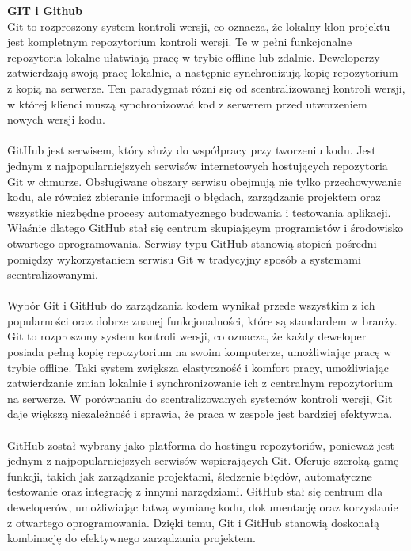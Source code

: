 \documentclass[12pt,a4paper]{article}
\begin{document}
\noindent \textbf{GIT i Github}\\
Git to rozproszony system kontroli wersji, co oznacza, że lokalny klon projektu jest kompletnym repozytorium kontroli wersji. Te w pełni funkcjonalne repozytoria lokalne ułatwiają pracę w trybie offline lub zdalnie. Deweloperzy zatwierdzają swoją pracę lokalnie, a następnie synchronizują kopię repozytorium z kopią na serwerze. Ten paradygmat różni się od scentralizowanej kontroli wersji, w której klienci muszą synchronizować kod z serwerem przed utworzeniem nowych wersji kodu.
\\\\
GitHub jest serwisem, który służy do współpracy przy tworzeniu kodu. Jest jednym z najpopularniejszych serwisów internetowych hostujących repozytoria Git w chmurze. Obsługiwane obszary serwisu obejmują nie tylko przechowywanie kodu, ale również zbieranie informacji o błędach, zarządzanie projektem oraz wszystkie niezbędne procesy automatycznego budowania i testowania aplikacji. Właśnie dlatego GitHub stał się centrum skupiającym programistów i środowisko otwartego oprogramowania. Serwisy typu GitHub stanowią stopień pośredni pomiędzy wykorzystaniem serwisu Git w tradycyjny sposób a systemami scentralizowanymi.
\\\\
Wybór Git i GitHub do zarządzania kodem wynikał przede wszystkim z ich popularności oraz dobrze znanej funkcjonalności, które są standardem w branży. Git to rozproszony system kontroli wersji, co oznacza, że każdy deweloper posiada pełną kopię repozytorium na swoim komputerze, umożliwiając pracę w trybie offline. Taki system zwiększa elastyczność i komfort pracy, umożliwiając zatwierdzanie zmian lokalnie i synchronizowanie ich z centralnym repozytorium na serwerze. W porównaniu do scentralizowanych systemów kontroli wersji, Git daje większą niezależność i sprawia, że praca w zespole jest bardziej efektywna.
\\\\
GitHub został wybrany jako platforma do hostingu repozytoriów, ponieważ jest jednym z najpopularniejszych serwisów wspierających Git. Oferuje szeroką gamę funkcji, takich jak zarządzanie projektami, śledzenie błędów, automatyczne testowanie oraz integrację z innymi narzędziami. GitHub stał się centrum dla deweloperów, umożliwiając łatwą wymianę kodu, dokumentację oraz korzystanie z otwartego oprogramowania. Dzięki temu, Git i GitHub stanowią doskonałą kombinację do efektywnego zarządzania projektem.
\\\\
\end{document}

